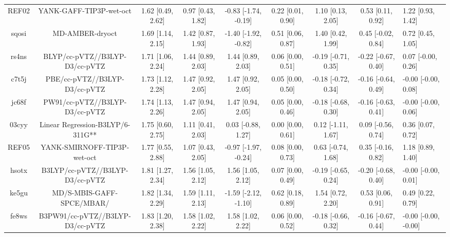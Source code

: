 \documentclass{article}
\begin{document}
\begin{center}
\begin{longtable}{|cccccccc|}
 REF02 &                            YANK-GAFF-TIP3P-wet-oct &  1.62 [0.49, 2.62] &  0.97 [0.43, 1.82] &  -0.83 [-1.74, -0.19] &  0.22 [0.01, 0.90] &    1.10 [0.13, 2.05] &    0.53 [0.11, 0.92] &     1.22 [0.93, 1.42] \\
 sqosi &                                    MD-AMBER-dryoct &  1.69 [1.14, 2.15] &  1.42 [0.87, 1.93] &  -1.40 [-1.92, -0.82] &  0.51 [0.06, 0.87] &    1.40 [0.42, 1.99] &   0.45 [-0.02, 0.84] &     0.72 [0.45, 1.05] \\
 rs4ns &                     BLYP/cc-pVTZ//B3LYP-D3/cc-pVTZ &  1.71 [1.06, 2.24] &  1.44 [0.89, 2.03] &     1.44 [0.89, 2.03] &  0.06 [0.00, 0.51] &  -0.19 [-0.71, 0.35] &  -0.22 [-0.67, 0.40] &    0.07 [-0.00, 0.26] \\
 c7t5j &                      PBE/cc-pVTZ//B3LYP-D3/cc-pVTZ &  1.73 [1.12, 2.28] &  1.47 [0.92, 2.05] &     1.47 [0.92, 2.05] &  0.05 [0.00, 0.50] &  -0.18 [-0.72, 0.34] &  -0.16 [-0.64, 0.49] &   -0.00 [-0.00, 0.08] \\
 jc68f &                     PW91/cc-pVTZ//B3LYP-D3/cc-pVTZ &  1.74 [1.13, 2.26] &  1.47 [0.94, 2.05] &     1.47 [0.94, 2.05] &  0.05 [0.00, 0.46] &  -0.18 [-0.68, 0.30] &  -0.16 [-0.63, 0.41] &   -0.00 [-0.00, 0.06] \\
 03cyy &                   Linear Regression-B3LYP/6-311G** &  1.75 [0.60, 2.75] &  1.11 [0.41, 2.03] &    0.03 [-0.88, 1.27] &  0.00 [0.00, 0.61] &   0.12 [-1.11, 1.67] &   0.09 [-0.56, 0.74] &     0.36 [0.07, 0.72] \\
 REF05 &                        YANK-SMIRNOFF-TIP3P-wet-oct &  1.77 [0.55, 2.88] &  1.07 [0.43, 2.05] &  -0.97 [-1.97, -0.24] &  0.08 [0.00, 0.73] &   0.63 [-0.74, 1.68] &   0.35 [-0.16, 0.82] &     1.18 [0.89, 1.40] \\
 hsotx &                    B3LYP/cc-pVTZ//B3LYP-D3/cc-pVTZ &  1.81 [1.27, 2.34] &  1.56 [1.05, 2.12] &     1.56 [1.05, 2.12] &  0.07 [0.00, 0.49] &  -0.19 [-0.65, 0.24] &  -0.20 [-0.68, 0.40] &   -0.00 [-0.00, 0.01] \\
 ke5gu &                          MD/S-MBIS-GAFF-SPCE/MBAR/ &  1.82 [1.34, 2.29] &  1.59 [1.11, 2.13] &  -1.59 [-2.12, -1.10] &  0.62 [0.18, 0.89] &    1.54 [0.72, 2.20] &    0.53 [0.06, 0.91] &     0.49 [0.22, 0.79] \\
 fe8ws &                   B3PW91/cc-pVTZ//B3LYP-D3/cc-pVTZ &  1.83 [1.20, 2.38] &  1.58 [1.02, 2.22] &     1.58 [1.02, 2.22] &  0.06 [0.00, 0.52] &  -0.18 [-0.66, 0.32] &  -0.16 [-0.67, 0.44] &  -0.00 [-0.00, -0.00] \\

\end{longtable}
\end{center}
\end{document}
